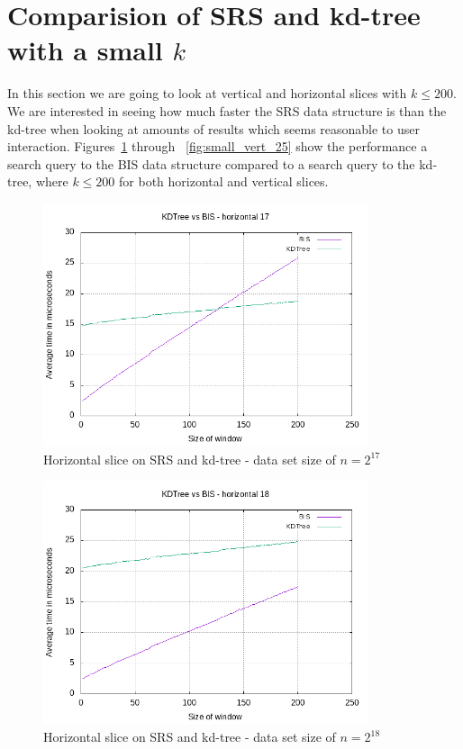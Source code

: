 


\section{Comparision of SRS and kd-tree with a small $k$}
\label{sect:smallk}


In this section we are going to look at vertical and horizontal slices with $k\leq 200$. We are interested in seeing how much faster the SRS data structure is than the kd-tree when looking at amounts of results which seems reasonable to user interaction. Figures~\ref{fig:small_hori_17} through ~\ref{fig:small_vert_25} show the performance a search query to the BIS data structure compared to a search query to the kd-tree, where $k \leq 200$ for both horizontal and vertical slices.

\begin{figure}[h]
    \centering
    \includegraphics[width = 0.85\textwidth]{pictures/analysis/smalls/hori_17.png}
    \caption{Horizontal slice on SRS and kd-tree - data set size of $n=2^{17}$}\label{fig:small_hori_17}
\end{figure}

\begin{figure}[h]
    \centering
    \includegraphics[width = 0.85\textwidth]{pictures/analysis/smalls/hori_18.png}
    \caption{Horizontal slice on SRS and kd-tree - data set size of $n=2^{18}$}\label{fig:small_hori_18}
\end{figure}

